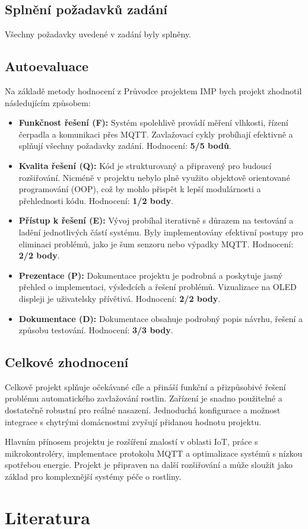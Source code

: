 \documentclass[a4paper, 11pt]{article}
\begin{document}
\subsection{Splnění požadavků zadání}

Všechny požadavky uvedené v zadání byly splněny.

\subsection{Autoevaluace}

Na základě metody hodnocení z Průvodce projektem IMP bych projekt zhodnotil následujícím způsobem:
\begin{itemize}
    \item \textbf{Funkčnost řešení (F):} Systém spolehlivě provádí měření vlhkosti, řízení čerpadla a komunikaci přes MQTT. Zavlažovací cykly probíhají efektivně a splňují všechny požadavky zadání. Hodnocení: \textbf{5/5 bodů}.
    \item \textbf{Kvalita řešení (Q):} Kód je strukturovaný a připravený pro budoucí rozšiřování. Nicméně v projektu nebylo plně využito objektově orientované programování (OOP), což by mohlo přispět k lepší modulárnosti a přehlednosti kódu. Hodnocení: \textbf{1/2 body}.    \item \textbf{Přístup k řešení (E):} Vývoj probíhal iterativně s důrazem na testování a ladění jednotlivých částí systému. Byly implementovány efektivní postupy pro eliminaci problémů, jako je šum senzoru nebo výpadky MQTT. Hodnocení: \textbf{2/2 body}.
    \item \textbf{Prezentace (P):} Dokumentace projektu je podrobná a poskytuje jasný přehled o implementaci, výsledcích a řešení problémů. Vizualizace na OLED displeji je uživatelsky přívětivá. Hodnocení: \textbf{2/2 body}.
    \item \textbf{Dokumentace (D):} Dokumentace obsahuje podrobný popis návrhu, řešení a způsobu testování. Hodnocení: \textbf{3/3 body}.
\end{itemize}

\subsection{Celkové zhodnocení}

Celkově projekt splňuje očekávané cíle a přináší funkční a přizpůsobivé řešení problému automatického zavlažování rostlin. Zařízení je snadno použitelné 
a dostatečně robustní pro reálné nasazení. Jednoduchá konfigurace a možnost integrace s chytrými domácnostmi zvyšují přidanou hodnotu projektu.

Hlavním přínosem projektu je rozšíření znalostí v oblasti IoT, práce s mikrokontroléry, implementace protokolu MQTT a optimalizace systémů s nízkou spotřebou energie. 
Projekt je připraven na další rozšiřování a může sloužit jako základ pro komplexnější systémy péče o rostliny.

\section{Literatura}
\end{document}
